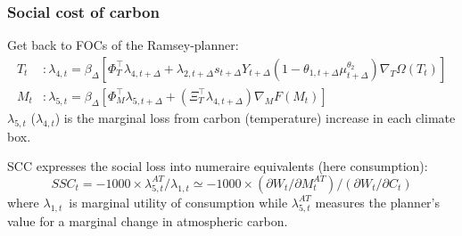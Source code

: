 \documentclass[xcolor=x11names,compress,aspectratio=169]{beamer}%
\makeatletter
\newenvironment{stepitemizewithalert}{\begin{itemize}[<+-| alert@+>]}{\end{itemize} }
\renewenvironment{itemize}{\begin{compactitemize}[<+-| alert@+>]}{\end{compactitemize}}
\renewenvironment{stepitemizewithalert}{\begin{compactitemize}[<+-| alert@+>]}{\end{compactitemize}}
\renewenvironment{stepitemizewithalert}{\begin{itemize}}{\end{itemize}}
\makeatother
\begin{document}
\begin{frame}%
%

\frametitle{Social cost of carbon}%


\begin{stepitemizewithalert}
\item Get back to FOCs of the Ramsey-planner:%
\begin{align*}
T_{t} &  :\lambda_{4,t}=\beta_{\Delta}\left[  \Phi_{T}^{\top}\lambda
_{4,t+\Delta}+\lambda_{2,t+\Delta}s_{t+\Delta}Y_{t+\Delta}\left(
1-\theta_{1,t+\Delta}\mu_{t+\Delta}^{\theta_{2}}\right)  \nabla_{T}%
\Omega\left(  T_{t}\right)  \right]  \\
M_{t} &  :\lambda_{5,t}=\beta_{\Delta}\left[  \Phi_{M}^{\top}\lambda
_{5,t+\Delta}+\left(  \Xi_{T}^{\top}\lambda_{4,t+\Delta}\right)  \nabla
_{M}F\left(  M_{t}\right)  \right]
\end{align*}
$\lambda_{5,t}$ ($\lambda_{4,t}$) is the marginal loss from carbon
(temperature) increase in each climate box.%
\vspace{1.5ex}%


\item SCC expresses the social loss into numeraire equivalents (here
consumption):%
\[
SSC_{t}=-1000\times\lambda_{5,t}^{AT}/\lambda_{1,t}\simeq-1000\times\left(
\partial W_{t}/\partial M_{t}^{AT}\right)  /\left(  \partial W_{t}/\partial
C_{t}\right)
\]
where $\lambda_{1,t}$\ is marginal utility of consumption while $\lambda
_{5,t}^{AT}$ measures the planner's value for a marginal change in atmospheric
carbon.%
\vspace{1.5ex}%

\end{stepitemizewithalert}

%

\transboxout
\end{frame}%
%
\end{document}
